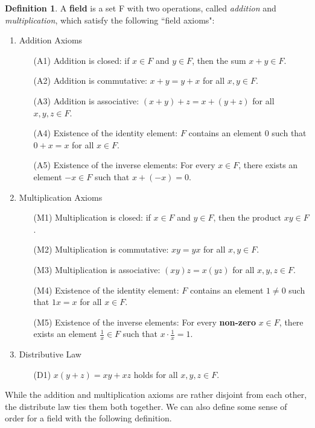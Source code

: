 \documentclass{article}
\theoremstyle{definition}
\newtheorem{definition}{Definition}[section]
\begin{document}
\begin{section}
\begin{definition}
A \textbf{field} is a set F with two operations, called \textit{addition} and \textit{multiplication}, which satisfy the following ``field axioms":
\begin{enumerate}
\item Addition Axioms
\begin{enumerate}
\item[(A1)] Addition is closed: if $x \in F$ and $y \in F$, then the sum $x+y \in F$.
\item[(A2)] Addition is commutative: $x+y = y + x$ for all $x,y \in F$.
\item[(A3)] Addition is associative: $(x+y) + z = x + (y+z)$ for all $x,y,z \in F$.
\item[(A4)] Existence of the identity element: $F$ contains an element $0$ such that $0 + x = x$ for all $x \in F$.
\item[(A5)] Existence of the inverse elements: For every $x \in F$, there exists an element $-x \in F$ such that $x + (-x) = 0$.
\end{enumerate}
\item Multiplication Axioms
\begin{enumerate}
\item[(M1)] Multiplication is closed: if $x \in F$ and $y \in F$, then the product $xy \in F$.
\item[(M2)] Multiplication is commutative: $xy = yx$ for all $x,y \in F$. 
\item[(M3)] Multiplication is associative: $(xy)z = x(yz)$ for all $x,y,z \in F$.
\item[(M4)] Existence of the identity element: $F$ contains an element $1 \neq 0$ such that $1x = x$ for all $x \in F$.
\item[(M5)] Existence of the inverse elements: For every \textbf{non-zero} $x \in F$, there exists an element $\frac{1}{x} \in F$ such that $x \cdot \frac{1}{x} = 1$. 
\end{enumerate}
\item Distributive Law
\begin{enumerate}
\item[(D1)] $x(y+z) = xy + xz$ holds for all $x,y,z \in F$.
\end{enumerate}
\end{enumerate}
\end{definition}
\noindent While the addition and multiplication axioms are rather disjoint from each other, the distribute law ties them both together. We can also define some sense of order for a field with the following definition.


\end{section}
\end{document}
